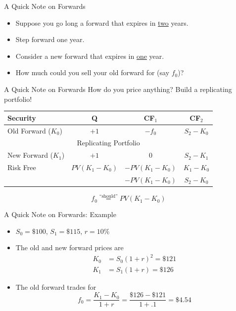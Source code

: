 \documentclass{beamer}
\begin{document}
\begin{frame}{A Quick Note on Forwards}
   \begin{itemize}
       \item Suppose you go long a forward that expires in \underline{two} years.
       \item Step forward one year. 
       \item Consider a new forward that expires in \underline{one} year.
       \item How much could you sell your old forward for (say $f_{0}$)? 
   \end{itemize}
\end{frame}

\begin{frame}{A Quick Note on Forwards}
    How do you price anything? Build a replicating portfolio!
    \begin{center}
        \begin{tabular}{lccc}
            Security & Q & CF$_{1}$ & CF$_{2}$ \\ \hline
            Old Forward ($K_{0}$) & $+1$ & $-f_{0}$ & $S_{2}-K_{0}$ \\ \hline
            \multicolumn{4}{c}{Replicating Portfolio} \\ \hline
            New Forward ($K_{1}$) & $+1$ & $0$ & $S_{2}-K_{1}$ \\ 
            Risk Free & $PV(K_{1}-K_{0})$ & $-PV(K_{1}-K_{0})$ & $K_{1}-K_{0}$ \\ \hline
            & & $-PV(K_{1}-K_{0})$ & $S_{2}-K_{0}$
        \end{tabular}
    \end{center}
    \begin{equation}
        \boxed{f_{0}\overset{\text{``should''}}{=}PV(K_{1}-K_{0})}
    \end{equation}
\end{frame}

\begin{frame}{A Quick Note on Forwards: Example}
    \begin{itemize}
        \item $S_{0}=\$100$, $S_{1}=\$115$, $r=10\%$
        \item The old and new forward prices are 
            \begin{align}
                K_{0}&=S_{0}(1+r)^{2}=\$121\\
                K_{1}&=S_{1}(1+r)=\$126
            \end{align}
        \item The old forward trades for
            \begin{equation}
                f_{0}=\frac{K_{1}-K_{0}}{1+r}=\frac{\$126-\$121}{1+.1}=\$4.54
            \end{equation}
    \end{itemize}
\end{frame}
\end{document}
